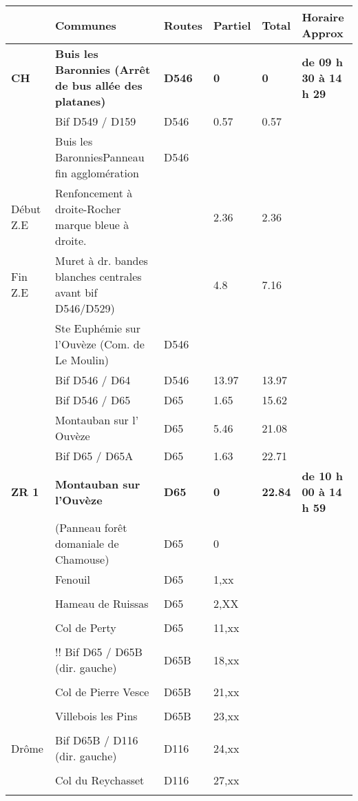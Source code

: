 \documentclass{article}%
\begin{document}
\begin{longtable}{p{2.25cm}|p{7.0cm}|p{1.5cm}|p{1.5cm}|p{1.5cm}|p{3.5cm}}%
\hline%
&Communes&Routes&Partiel&Total&Horaire Approx\\%
\hline%
\endhead%
\endfoot%
\endlastfoot%
\textbf{﻿CH}&\textbf{Buis les Baronnies (Arrêt de bus allée des platanes)}&\textbf{D546}&\textbf{0}&\textbf{0}&\textbf{de 09 h 30 à 14 h 29}\\%
 &Bif D549 / D159 &D546 &0.57&0.57& \\%
 &Buis les BaronniesPanneau fin agglomération&D546& & & \\%
Début Z.E&Renfoncement à droite-Rocher marque bleue à droite.& &2.36&2.36& \\%
Fin Z.E&Muret à dr. bandes blanches centrales avant bif D546/D529)& &4.8&7.16& \\%
 &Ste Euphémie sur l'Ouvèze (Com. de Le Moulin)&D546& & & \\%
 &Bif D546 / D64 &D546&13.97&13.97& \\%
 &Bif D546 / D65&D65 &1.65&15.62& \\%
 &Montauban sur l' Ouvèze &D65&5.46&21.08& \\%
 &Bif D65 / D65A&D65&1.63&22.71& \\%
\textbf{ZR 1}&\textbf{Montauban sur l'Ouvèze}&\textbf{D65}&\textbf{0}&\textbf{22.84}&\textbf{de 10 h 00 à 14 h 59}\\%
 &(Panneau forêt domaniale de Chamouse)&D65&0& & \\%
 &Fenouil &D65&1,xx& & \\%
 & & & & & \\%
 &Hameau de Ruissas &D65&2,XX& & \\%
 & & & & & \\%
 &Col de Perty&D65&11,xx& & \\%
 & & & & & \\%
 &!! Bif D65 / D65B (dir. gauche)&D65B&18,xx& & \\%
 & & & & & \\%
 &Col de Pierre Vesce&D65B&21,xx& & \\%
 & & & & & \\%
 &Villebois les Pins&D65B &23,xx& & \\%
 & & & & & \\%
Drôme&Bif D65B / D116 (dir. gauche)&D116&24,xx& & \\%
 & & & & & \\%
 &Col du Reychasset&D116&27,xx& & \\%
 & & & & & \\%

\end{longtable}
\end{document}
